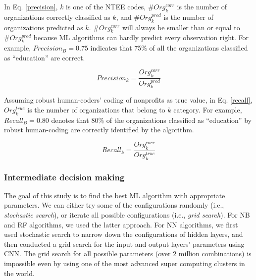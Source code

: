 \documentclass[11pt]{article}
\begin{document}



In Eq. \ref{precision}, $k$ is one of the NTEE codes, $\#Org^{corr}_{k}$ is the number of organizations correctly classified as $k$, and ${\#Org^{pred}_{k}}$ is the number of organizations predicted as $k$. $\#Org^{corr}_{k}$ will always be smaller than or equal to ${\#Org^{pred}_{k}}$ because ML algorithms can hardly predict every observation right. For example, $Precision_{B}=0.75$ indicates that 75\% of all the organizations classified as ``education'' are correct.

\begin{equation} \label{precision}
    Precision_{k}=\frac{Org^{corr}_{k}}{Org^{pred}_{k}}
\end{equation}

Assuming robust human-coders' coding of nonprofits as true value, in Eq. \ref{recall}, $Org^{true}_{k}$ is the number of organizations that belong to $k$ category. For example, $Recall_{B}=0.80$ denotes that 80\% of the organizations classified as ``education'' by robust human-coding are correctly identified by the algorithm.

\begin{equation} \label{recall}
    Recall_{k}=\frac{Org^{corr}_{k}}{Org^{true}_{k}}
\end{equation}

\subsubsection{Intermediate decision making}

The goal of this study is to find the best ML algorithm with appropriate parameters. We can either try some of the configurations randomly (i.e., \textit{stochastic search}), or iterate all possible configurations (i.e., \textit{grid search}). For NB and RF algorithms, we used the latter approach. For NN algorithms, we first used stochastic search to narrow down the configurations of hidden layers, and then conducted a grid search for the input and output layers' parameters using CNN. The grid search for all possible parameters (over 2 million combinations) is impossible even by using one of the most advanced super computing clusters in the world.
\end{document}
